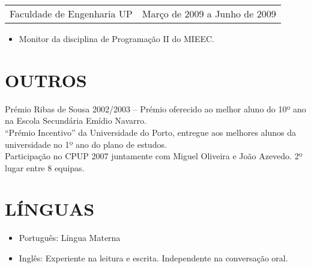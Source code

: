 \documentclass[margin]{res}
\begin{document}
\begin{resume}
                 \begin{tabular}{p{3in} r} %
                  Faculdade de Engenharia UP &  Março de 2009 a Junho de 2009
                 \end{tabular}
                  \begin{itemize}					        
                   \item[] Monitor da disciplina de Programação II do MIEEC.
                  \end{itemize}
                  
\section{OUTROS} Prémio Ribas de Sousa 2002/2003 – Prémio oferecido ao melhor aluno do 10º ano na Escola
                  Secundária Emídio Navarro. \\
                  “Prémio Incentivo” da Universidade do Porto, entregue aos melhores alunos da universidade
                  no 1º ano do plano de estudos. \\
                  Participação no CPUP 2007 juntamente com Miguel Oliveira e João Azevedo. 2º lugar entre 8 equipas. \\
                  
\section{LÍNGUAS}
      \begin{itemize}
        \item Português: Língua Materna
        \item Inglês: Experiente na leitura e escrita. Independente na conversação oral.
      \end{itemize}
 
\end{resume} 
\end{document}
